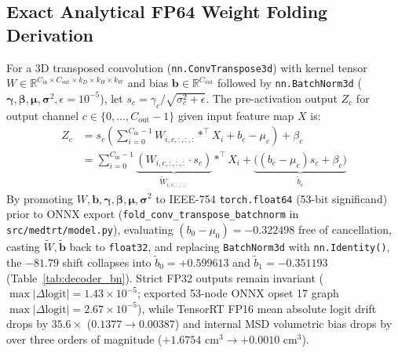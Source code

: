 \documentclass[10pt,twocolumn]{article}
\begin{document}
\subsection{Exact Analytical FP64 Weight Folding Derivation}
For a 3D transposed convolution (\texttt{nn.ConvTranspose3d}) with kernel tensor $W \in \mathbb{R}^{C_{\text{in}} \times C_{\text{out}} \times k_D \times k_H \times k_W}$ and bias $\mathbf{b} \in \mathbb{R}^{C_{\text{out}}}$ followed by \texttt{nn.BatchNorm3d} ($\boldsymbol{\gamma}, \boldsymbol{\beta}, \boldsymbol{\mu}, \boldsymbol{\sigma}^2, \epsilon = 10^{-5}$), let $s_c = \gamma_c / \sqrt{\sigma_c^2 + \epsilon}$. The pre-activation output $Z_c$ for output channel $c \in \{0, \dots, C_{\text{out}}-1\}$ given input feature map $X$ is:
\begin{equation}
\begin{aligned}
    Z_c &= s_c \left(\sum_{i=0}^{C_{\text{in}}-1} W_{i, c, :, :, :} *^\top X_i + b_c - \mu_c\right) + \beta_c \\
    &= \sum_{i=0}^{C_{\text{in}}-1} \underbrace{\left(W_{i, c, :, :, :} \cdot s_c\right)}_{\widetilde{W}_{i, c, :, :, :}} *^\top X_i + \underbrace{\big((b_c - \mu_c) s_c + \beta_c\big)}_{\widetilde{b}_c}
\end{aligned}
\label{eq:bn_fold}
\end{equation}
By promoting $W, \mathbf{b}, \boldsymbol{\gamma}, \boldsymbol{\beta}, \boldsymbol{\mu}, \boldsymbol{\sigma}^2$ to IEEE-754 \texttt{torch.float64} (53-bit significand) prior to ONNX export (\texttt{fold\_conv\_transpose\_batchnorm} in \texttt{src/medtrt/model.py}), evaluating $(b_0 - \mu_0) = -0.322498$ free of cancellation, casting $\widetilde{W}, \widetilde{\mathbf{b}}$ back to \texttt{float32}, and replacing \texttt{BatchNorm3d} with \texttt{nn.Identity()}, the $-81.79$ shift collapses into $\widetilde{b}_0 = +0.599613$ and $\widetilde{b}_1 = -0.351193$ (Table~\ref{tab:decoder_bn}). Strict FP32 outputs remain invariant ($\max \lvert \Delta\text{logit}\rvert = 1.43 \times 10^{-5}$; exported 53-node ONNX opset 17 graph $\max \lvert \Delta\text{logit}\rvert = 2.67 \times 10^{-5}$), while TensorRT FP16 mean absolute logit drift drops by $\mathbf{35.6\times}$ ($0.1377 \to 0.00387$) and internal MSD volumetric bias drops by over three orders of magnitude ($+1.6754\text{ cm}^3 \to +0.0010\text{ cm}^3$).
\end{document}
